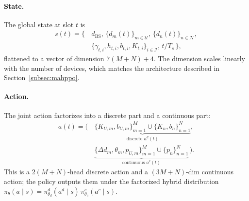 \paragraph{State.} The global state at slot $t$ is
\begin{equation}
\begin{aligned}
s(t) = \big\{\,&d_{\mathrm{BS}},\,\{d_m(t)\}_{m\in\mathcal{U}},\,
              \{d_n(t)\}_{n\in\mathcal{N}},\\
              &\{\gamma_{t,i},h_{t,i},b_{t,i},K_{t,i}\}_{i\in\mathcal{I}},\,
              t/T_s\,\big\},
\end{aligned}
\label{eq:state}
\end{equation}
flattened to a vector of dimension $7(M+N)+4$. The dimension scales
linearly with the number of devices, which matches the architecture
described in Section~\ref{subsec:mahppo}.

\paragraph{Action.} The joint action factorizes into a discrete part and
a continuous part:
\begin{equation}
\begin{aligned}
a(t) = \big(\,&\underbrace{\{K_{U,m},b_{U,m}\}_{m=1}^{M}\cup
  \{K_{n},b_{n}\}_{n=1}^{N}}_{\text{discrete }a^{d}(t)},\\
  &\underbrace{\{\Delta d_{m},\theta_{m},p_{U,m}\}_{m=1}^{M}\cup
  \{p_{n}\}_{n=1}^{N}}_{\text{continuous }a^{c}(t)}\,\big).
\end{aligned}
\label{eq:action}
\end{equation}
This is a $2(M+N)$-head discrete action and a $(3M+N)$-dim continuous
action; the policy outputs them under the factorized hybrid
distribution
$\pi_{\theta}(a\mid s)=\pi_{\theta_d}^{d}(a^{d}\mid s)\,\pi_{\theta_c}^{c}(a^{c}\mid s)$.


